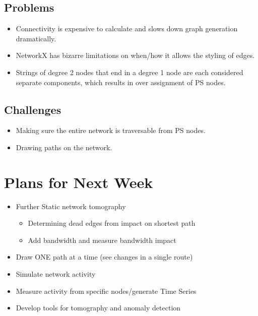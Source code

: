 \documentclass{weeklyreport}
\begin{document}
\subsection*{Problems}

\begin{itemize}
	\item Connectivity is expensive to calculate and slows down graph generation dramatically.
	\item NetworkX has bizarre limitations on when/how it allows the styling of edges.
	\item Strings of degree 2 nodes that end in a degree 1 node are each considered separate components, which results in over assignment of PS nodes.
\end{itemize}

\subsection*{Challenges}

\begin{itemize}
    \item Making sure the entire network is traversable from PS nodes.
    \item Drawing paths on the network.
\end{itemize}

\section*{Plans for Next Week}

\begin{itemize}
	\item Further Static network tomography
	\begin{itemize}
		\item Determining dead edges from impact on shortest path
		\item Add bandwidth and measure bandwidth impact
	\end{itemize}
	\item Draw ONE path at a time (see changes in a single route)
	\item Simulate network activity
	\item Measure activity from specific nodes/generate Time Series
	\item Develop tools for tomography and anomaly detection
\end{itemize}
\end{document}
